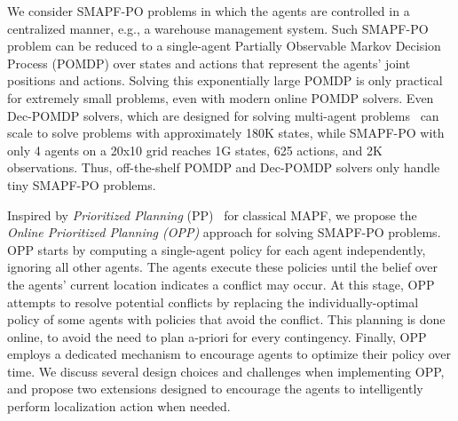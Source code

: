 \documentclass[letterpaper]{article} %
\begin{document}
We consider SMAPF-PO problems in which the agents are controlled in a centralized manner, e.g., a warehouse management system.
Such SMAPF-PO problem can be reduced to a single-agent Partially Observable Markov Decision Process (POMDP) over states and actions that represent the agents' joint positions and actions. Solving this exponentially large POMDP is only practical for extremely small problems, even with modern online POMDP solvers. Even Dec-POMDP solvers, which are designed for solving multi-agent problems~\cite{amato2019modeling} can scale to solve problems with approximately 180K states, while SMAPF-PO with only 4 agents on a 20x10 grid reaches 1G states, 625 actions, and 2K observations.
Thus, off-the-shelf POMDP and Dec-POMDP solvers only handle tiny SMAPF-PO problems.




Inspired by \emph{Prioritized Planning} (PP)~\cite{silver2005cooperative} for classical MAPF,
we propose the \emph{Online Prioritized Planning (OPP)} approach for solving SMAPF-PO problems.
OPP starts by computing a single-agent policy for each agent independently, ignoring all other agents.
The agents execute these policies until the belief over the agents' current location indicates a conflict may occur. %
At this stage, OPP attempts to resolve potential conflicts by replacing the individually-optimal policy of some agents with policies that avoid the conflict. This planning is done online, to avoid the need to plan a-priori for every contingency. Finally, OPP employs a dedicated mechanism to encourage agents to optimize their policy over time.
We discuss several design choices and challenges when implementing OPP, and propose two extensions designed to encourage the agents to intelligently perform localization action when needed.
\end{document}
